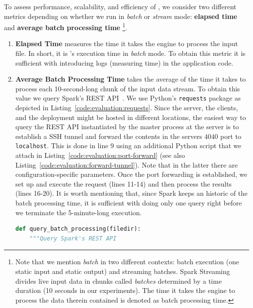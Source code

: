 To assess performance, scalability, and efficiency of \projName, we consider two different metrics depending on whether we run in \emph{batch} or \emph{stream} mode: \textbf{elapsed time} and \textbf{average batch processing time}
\footnote{
Note that we mention \textit{batch} in two different contexts: batch execution (one static input and static output) and streaming batches.
Spark Streaming divides live input data in chunks called \emph{batches} determined by a time duration (10 seconds in our experiments).
The time it takes the engine to process the data therein contained is denoted as batch processing time.}.
\begin{enumerate}
    \item \textbf{Elapsed Time} measures the time it takes the engine to process the input file. In short, it is \projName's execution time in \emph{batch} mode. To obtain this metric it is sufficient with introducing logs (measuring time) in the application code.
    \item \textbf{Average Batch Processing Time} takes the average of the time it takes \projName to process each 10-second-long chunk of the input data stream. To obtain this value we query Spark's REST API~\cite{spark-rest-api}. We use Python's \texttt{requests} package as depicted in Listing~\ref{code:evaluation:requests}. Since the server, the clients, and the deployment might be hosted in different locations, the easiest way to query the REST API instantiated by the master process at the server is to establish a SSH tunnel and forward the contents in the servers $4040$ port to \texttt{localhost}. This is done in line 9 using an additional Python script that we attach in Listing~\ref{code:evaluation:port-forward} (see also Listing~\ref{code:evaluation:forward-tunnel}). Note that in the latter there are configuration-specific parameters. Once the port forwarding is established, we set up and execute the request (lines 11-14) and then process the results (lines 16-20). It is worth mentioning that, since Spark keeps an historic of the batch processing time, it is sufficient with doing only one query right before we terminate the 5-minute-long execution.
\begin{lstlisting}[language=Python,caption={Snippet illustrating a query to Spark's REST API.},label=code:evaluation:requests]
def query_batch_processing(filedir):
    """Query Spark's REST API 


\end{lstlisting}
\end{enumerate}
